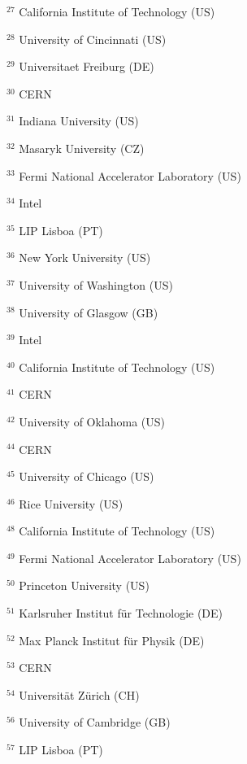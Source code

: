 \par {\footnotesize $^{27}$ California Institute of Technology (US)}
\par {\footnotesize $^{28}$ University of Cincinnati (US)}
\par {\footnotesize $^{29}$ Universitaet Freiburg (DE)}
\par {\footnotesize $^{30}$ CERN}
\par {\footnotesize $^{31}$ Indiana University (US)}
\par {\footnotesize $^{32}$ Masaryk University (CZ)}
\par {\footnotesize $^{33}$ Fermi National Accelerator Laboratory (US)}
\par {\footnotesize $^{34}$ Intel}
\par {\footnotesize $^{35}$ LIP Lisboa (PT)}
\par {\footnotesize $^{36}$ New York University (US)}
\par {\footnotesize $^{37}$ University of Washington (US)}
\par {\footnotesize $^{38}$ University of Glasgow (GB) }
\par {\footnotesize $^{39}$ Intel}
\par {\footnotesize $^{40}$ California Institute of Technology (US)}
\par {\footnotesize $^{41}$ CERN}
\par {\footnotesize $^{42}$ University of Oklahoma (US)}
\par {\footnotesize $^{44}$ CERN}
\par {\footnotesize $^{45}$ University of Chicago (US)}
\par {\footnotesize $^{46}$ Rice University (US)}
\par {\footnotesize $^{48}$ California Institute of Technology (US)}
\par {\footnotesize $^{49}$ Fermi National Accelerator Laboratory (US)}
\par {\footnotesize $^{50}$ Princeton University (US)}
\par {\footnotesize $^{51}$ Karlsruher Institut f{\"u}r Technologie (DE)}
\par {\footnotesize $^{52}$ Max Planck Institut f{\"u}r Physik (DE)}
\par {\footnotesize $^{53}$ CERN}
\par {\footnotesize $^{54}$ Universit{\"a}t Z{\"u}rich (CH)}
\par {\footnotesize $^{56}$ University of Cambridge (GB)}
\par {\footnotesize $^{57}$ LIP Lisboa (PT)}
